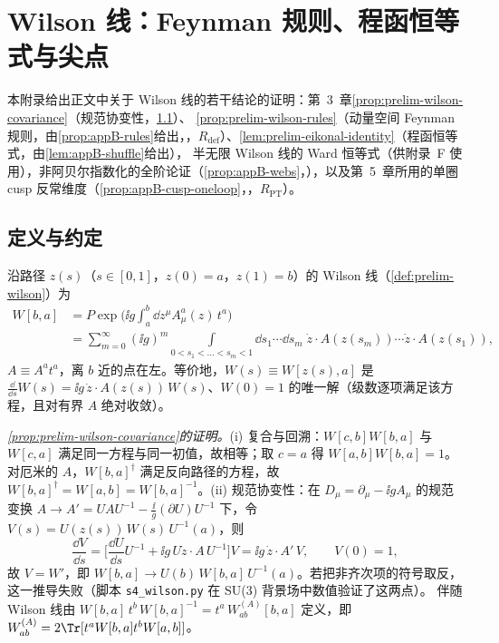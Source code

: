 \chapter{Wilson 线：Feynman 规则、程函恒等式与尖点}\label{app:appB}

本附录给出正文中关于 Wilson 线的若干结论的证明：第~3~章\cref{prop:prelim-wilson-covariance}（规范协变性，\cref{sec:appB-definition}）、
\cref{prop:prelim-wilson-rules}（动量空间 Feynman 规则，由\cref{prop:appB-rules}给出，\tagR，$R_{\mathrm{def}}$）、\cref{lem:prelim-eikonal-identity}（程函恒等式，由\cref{lem:appB-shuffle}给出），
半无限 Wilson 线的 Ward 恒等式（供附录~F 使用），非阿贝尔指数化的全阶论证（\cref{prop:appB-webs}，\tagA），以及第~5~章所用的单圈 cusp 反常维度（\cref{prop:appB-cusp-oneloop}，\tagR，$R_{\mathrm{PT}}$）。

\section{定义与约定}\label{sec:appB-definition}

沿路径 $z(s)$（$s\in[0,1]$，$z(0)=a$，$z(1)=b$）的 Wilson 线（\cref{def:prelim-wilson}）为
\begin{equation}\label{eq:appB-W}
\begin{aligned}
W[b,a]&=P\exp\Big(\ii g\int_a^b\dd z^\mu A^a_\mu(z)\,t^a\Big)\\
&=\sum_{m=0}^\infty(\ii g)^m\!\!\int\limits_{0<s_1<\dots<s_m<1}\!\!\dd s_1\cdots\dd s_m\;
\dot z\cdot A(z(s_m))\cdots\dot z\cdot A(z(s_1)),
\end{aligned}
\end{equation}
$A\equiv A^at^a$，离 $b$ 近的点在左。等价地，$W(s)\equiv W[z(s),a]$ 是 $\frac{\dd}{\dd s}W(s)=\ii g\,\dot z\cdot A(z(s))\,W(s)$、$W(0)=1$ 的唯一解（级数逐项满足该方程，且对有界 $A$ 绝对收敛）。

\emph{\cref{prop:prelim-wilson-covariance}的证明。}(i) 复合与回溯：$W[c,b]W[b,a]$ 与 $W[c,a]$ 满足同一方程与同一初值，故相等；取 $c=a$ 得 $W[a,b]W[b,a]=1$。
对厄米的 $A$，$W[b,a]^\dagger$ 满足反向路径的方程，故 $W[b,a]^\dagger=W[a,b]=W[b,a]^{-1}$。(ii) 规范协变性：在 $D_\mu=\partial_\mu-\ii gA_\mu$ 的规范变换
$A\to A'=UAU^{-1}-\frac{\ii}g(\partial U)U^{-1}$ 下，令 $V(s)=U(z(s))\,W(s)\,U^{-1}(a)$，则
\[
\frac{\dd V}{\dd s}=\Big[\frac{\dd U}{\dd s}U^{-1}+\ii g\,U\dot z\cdot A\,U^{-1}\Big]V=\ii g\,\dot z\cdot A'\,V,\qquad V(0)=1,
\]
故 $V=W'$，即 $W[b,a]\to U(b)\,W[b,a]\,U^{-1}(a)$。若把非齐次项的符号取反，这一推导失败（脚本 \texttt{s4\_wilson.py} 在 SU(3) 背景场中数值验证了这两点）。
伴随 Wilson 线由 $W[b,a]\,t^b\,W[b,a]^{-1}=t^a\,W^{(A)}_{ab}[b,a]$ 定义，即 $W^{(A)}_{ab}=2\Tr[t^aW[b,a]t^bW[a,b]]$。

